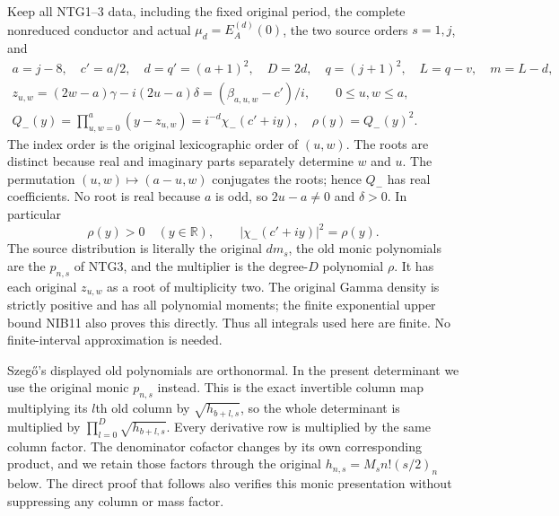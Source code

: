 \documentclass[11pt,a4paper]{article}
\begin{document}
Keep all NTG1--3 data, including the fixed original period,
the complete nonreduced conductor and actual $\mu_d=E_A^{(d)}(0)$,
the two source orders $s=1,j$, and
\[
\begin{gathered}
 a=j-8,\quad c'=a/2,\quad d=q'=(a+1)^2,\quad D=2d,\quad
 q=(j+1)^2,\quad L=q-v,\quad m=L-d,\\
 z_{u,w}=(2w-a)\gamma-i(2u-a)\delta
       =(\beta_{a,u,w}-c')/i,\qquad 0\le u,w\le a,\\
 Q_-(y)=\prod_{u,w=0}^{a}(y-z_{u,w})
       =i^{-d}\chi_-(c'+iy),\quad
 \rho(y)=Q_-(y)^2 .
\end{gathered}                                                    \tag{SLC1}
\]
The index order is the original lexicographic order of $(u,w)$.
The roots are distinct because real and imaginary parts
separately determine $w$ and $u$. The permutation
$(u,w)\mapsto(a-u,w)$ conjugates the roots; hence $Q_-$
has real coefficients. No root is real because $a$ is odd,
so $2u-a\ne0$ and $\delta>0$. In particular
\[
 \rho(y)>0\quad(y\in\mathbb R),\qquad
 |\chi_-(c'+iy)|^2=\rho(y).
                                                               \tag{SLC2}
\]
The source distribution is literally the original $dm_s$,
the old monic polynomials are the $p_{n,s}$ of NTG3,
and the multiplier is the degree-$D$ polynomial $\rho$.
It has each original $z_{u,w}$ as a root of multiplicity two.
The original Gamma density is strictly positive and has
all polynomial moments; the finite exponential upper bound
NIB11 also proves this directly. Thus all integrals used
here are finite. No finite-interval approximation is needed.

Szeg\H{o}'s displayed old polynomials are orthonormal.
In the present determinant we use the original monic
$p_{n,s}$ instead. This is the exact invertible column
map multiplying its $l$th old column by
$\sqrt{h_{b+l,s}}$, so the whole determinant is multiplied
by $\prod_{l=0}^{D}\sqrt{h_{b+l,s}}$. Every derivative
row is multiplied by the same column factor.
The denominator cofactor changes by its own corresponding
product, and we retain those factors through the original
$h_{n,s}=M_sn!(s/2)_n$ below. The direct proof that follows
also verifies this monic presentation without suppressing
any column or mass factor.
\end{document}

